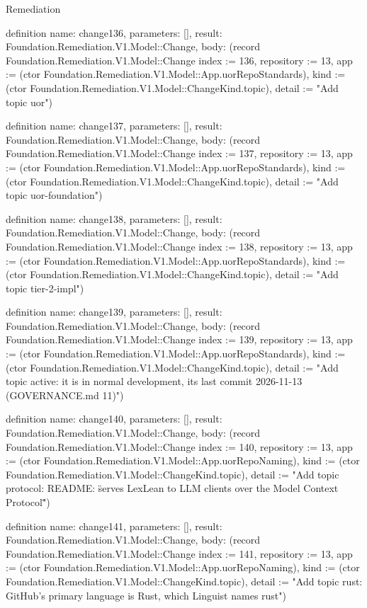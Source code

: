 \begin{lexlean}{Remediation}
\begin{semanticmodule}
definition{
  name: change136,
  parameters: [],
  result: Foundation.Remediation.V1.Model::Change,
  body: (record Foundation.Remediation.V1.Model::Change {index := 136, repository := 13, app := (ctor Foundation.Remediation.V1.Model::App.uorRepoStandards), kind := (ctor Foundation.Remediation.V1.Model::ChangeKind.topic), detail := "Add topic uor"})
}

definition{
  name: change137,
  parameters: [],
  result: Foundation.Remediation.V1.Model::Change,
  body: (record Foundation.Remediation.V1.Model::Change {index := 137, repository := 13, app := (ctor Foundation.Remediation.V1.Model::App.uorRepoStandards), kind := (ctor Foundation.Remediation.V1.Model::ChangeKind.topic), detail := "Add topic uor-foundation"})
}

definition{
  name: change138,
  parameters: [],
  result: Foundation.Remediation.V1.Model::Change,
  body: (record Foundation.Remediation.V1.Model::Change {index := 138, repository := 13, app := (ctor Foundation.Remediation.V1.Model::App.uorRepoStandards), kind := (ctor Foundation.Remediation.V1.Model::ChangeKind.topic), detail := "Add topic tier-2-impl"})
}

definition{
  name: change139,
  parameters: [],
  result: Foundation.Remediation.V1.Model::Change,
  body: (record Foundation.Remediation.V1.Model::Change {index := 139, repository := 13, app := (ctor Foundation.Remediation.V1.Model::App.uorRepoStandards), kind := (ctor Foundation.Remediation.V1.Model::ChangeKind.topic), detail := "Add topic active: it is in normal development, its last commit 2026-11-13 (GOVERNANCE.md 11)"})
}

definition{
  name: change140,
  parameters: [],
  result: Foundation.Remediation.V1.Model::Change,
  body: (record Foundation.Remediation.V1.Model::Change {index := 140, repository := 13, app := (ctor Foundation.Remediation.V1.Model::App.uorRepoNaming), kind := (ctor Foundation.Remediation.V1.Model::ChangeKind.topic), detail := "Add topic protocol: README: \"serves LexLean to LLM clients over the Model Context Protocol\""})
}

definition{
  name: change141,
  parameters: [],
  result: Foundation.Remediation.V1.Model::Change,
  body: (record Foundation.Remediation.V1.Model::Change {index := 141, repository := 13, app := (ctor Foundation.Remediation.V1.Model::App.uorRepoNaming), kind := (ctor Foundation.Remediation.V1.Model::ChangeKind.topic), detail := "Add topic rust: GitHub's primary language is Rust, which Linguist names rust"})
}


\end{semanticmodule}
\end{lexlean}
